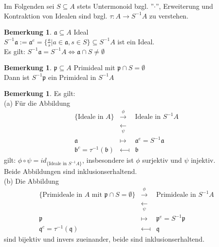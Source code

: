 \documentclass[10pt,a4paper,numbers=endperiod]{scrreprt}
\theoremstyle{definition}
\newtheorem{bem}[satz]{Bemerkung}
\begin{document}
Im Folgenden sei $S \subseteq A$ stets Untermonoid bzgl. ''$\cdot$'', Erweiterung und Kontraktion von Idealen sind bzgl. $\tau: A \to S^{-1}A$ zu verstehen.

\begin{bem}
	$\mathfrak{a} \subseteq A$ Ideal\\
	$S^{-1} \mathfrak{a} := \mathfrak{a}^e = \{ \frac{a}{s}| a \in \mathfrak{a}, s \in S\} \subseteq S^{-1}A$ ist ein Ideal.\\
	Es gilt: $S^{-1} \mathfrak{a} = S^{-1} A \Leftrightarrow \mathfrak{a} \cap S \neq \emptyset$
\end{bem}

\begin{bem}
	$\mathfrak{p} \subseteq A$ Primideal mit $\mathfrak{p} \cap S = \emptyset$\\
	Dann ist $S^{-1} \mathfrak{p}$ ein Primideal in $S^{-1}A$
\end{bem}

\begin{bem}
	Es gilt:\\
	(a) Für die Abbildung \begin{eqnarray*}
		\{\text{Ideale in $A$}\} &\overset{\phi}{\longrightarrow}& \text{Ideale in $S^{-1}A$}\\
			&\underset{\psi}{\longleftarrow}&\\
		 \mathfrak{a} &\longmapsto& \mathfrak{a}^e = S^{-1} \mathfrak{a}\\
		\mathfrak{b}^c = \tau^{-1}(\mathfrak{b}) &\longmapsfrom& \mathfrak{b}
	\end{eqnarray*}
	gilt: $\phi \circ \psi = id_{\{\text{Ideale in } S^{-1} A\}}$, insbesondere ist $\phi$ surjektiv und $\psi$ injektiv.\\
	Beide Abbildungen sind inklusionserhaltend.\\
	(b) Die Abbildung \begin{eqnarray*}
		\{\text{Primideale in $A$ mit $\mathfrak{p} \cap S = \emptyset$}\} &\overset{\phi}{\longrightarrow}& \text{Primideale in $S^{-1}A$}\\
		&\underset{\psi}{\longleftarrow}&\\
		\mathfrak{p} &\longmapsto& \mathfrak{p}^e = S^{-1} \mathfrak{p}\\
		\mathfrak{q}^c = \tau^{-1}(\mathfrak{q}) &\longmapsfrom& \mathfrak{q}
	\end{eqnarray*}
	sind bijektiv und invers zueinander, beide sind inklusionserhaltend. 
\end{bem}
\end{document}
